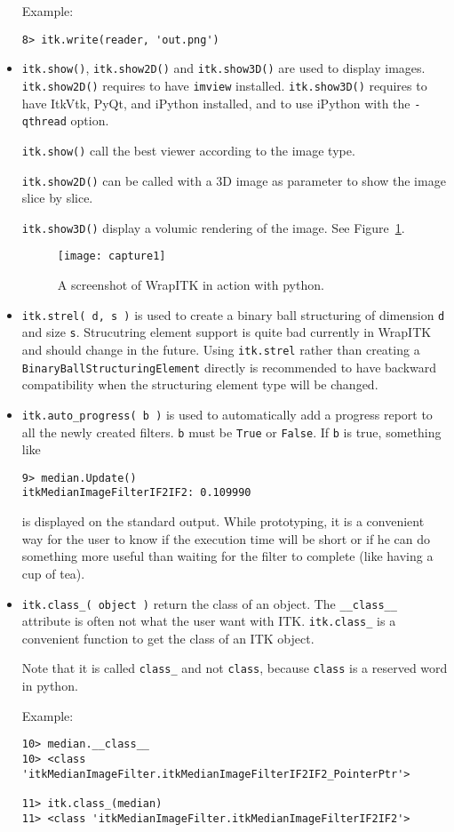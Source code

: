 \documentclass{InsightArticle}
\begin{document}
\begin{itemize}
Example:
\begin{verbatim}
8> itk.write(reader, 'out.png')
\end{verbatim}

  \item \verb$itk.show()$, \verb$itk.show2D()$ and \verb$itk.show3D()$ are used to
display images. \verb$itk.show2D()$ requires to have \verb$imview$ installed.
\verb$itk.show3D()$ requires to have ItkVtk, PyQt, and iPython installed, and to use
iPython with the \verb$-qthread$ option.

\verb$itk.show()$ call the best viewer according to the image type.

\verb$itk.show2D()$
can be called with a 3D image as parameter to show the image slice by slice.

\verb$itk.show3D()$ display a volumic rendering of the image. See Figure~\ref{screenshot}.

\begin{figure}[htbp]
\centering
\texttt{[image: capture1]}
\caption{A screenshot of WrapITK in action with python.\label{screenshot}}
\end{figure}

  \item \verb$itk.strel( d, s )$ is used to create a binary ball structuring of dimension
\verb$d$ and size \verb$s$. Strucutring element support is quite bad currently in WrapITK
and should change in the future. Using \verb$itk.strel$ rather than creating a
\verb$BinaryBallStructuringElement$ directly is recommended to have backward compatibility
when the structuring element type will be changed.

  \item \verb$itk.auto_progress( b )$ is used to automatically add a progress report
to all the newly created filters. \verb$b$ must be \verb$True$ or \verb$False$. If
\verb$b$ is true, something like
\begin{verbatim}
9> median.Update()
itkMedianImageFilterIF2IF2: 0.109990
\end{verbatim}
is displayed on the standard output. 
While prototyping, it is a convenient way for the user to know if
the execution time will be short or if he can do something more useful than waiting
for the filter to complete (like having a cup of tea).

  \item \verb$itk.class_( object )$ return the class of an object. The \verb$__class__$
attribute is often not what the user want with ITK. \verb$itk.class_$ is a convenient
function to get the class of an ITK object.

Note that it is called \verb$class_$ and not \verb$class$, because \verb$class$ is a
reserved word in python.

Example:
\begin{verbatim}
10> median.__class__
10> <class 'itkMedianImageFilter.itkMedianImageFilterIF2IF2_PointerPtr'>

11> itk.class_(median)
11> <class 'itkMedianImageFilter.itkMedianImageFilterIF2IF2'>
\end{verbatim}


\end{itemize}
\end{document}
